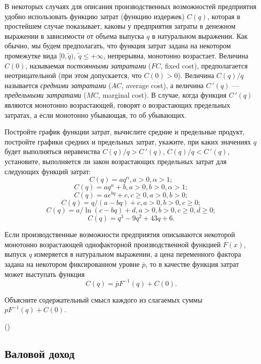     В некоторых случаях для описания производственных возможностей
    предприятия удобно использовать функцию
    затрат (функцию издержек) $C(q)$, которая в простейшем случае показывает, каковы у
    предприятия затраты в денежном выражении в зависимости
    от объема выпуска $q$ в натуральном выражении.
       Как обычно, мы будем предполагать, что функция затрат задана
    на некотором промежутке вида $[0,\tilde{q}), \ \tilde{q}\leqslant+\infty$,
    непрерывна, монотонно возрастает. Величина $C(0)$, называемая
    \emph{постоянными затратами} ($FC$, fixed cost), предполагается
    неотрицательной (при этом допускается, что $C(0)>0$).
    Величина $C(q)/q$ называется \emph{средними затратами} ($AC$, average cost), а величина
    $C\,'(q)$ --- \emph{предельными затратами} ($MC$, marginal cost).
    В случае, когда функция $C\,'(q)$
     являются монотонно возрастающей, говорят о
    возрастающих предельных затратах, а если монотонно убывающая, то об убывающих.

\begin{exer}
    Постройте график функции затрат, вычислите средние и предельные продукт,
    постройте графики средних и предельных затрат, укажите, при каких значениях $q$
     будет выполняться неравенства $C(q)/q>C\,'(q)$, $C(q)/q<C\,'(q)$, установите, выполняется ли закон
     возрастающих предельных затрат для следующих функций затрат:
    \[C(q)=aq^{\alpha}, a>0,  \alpha>1;\]
    \[C(q)=aq^{\alpha}+b, a>0, b>0,  \alpha>1;\]
    \[C(q)=ae^{bq}+c, c\geq0, a>0, b>0;\]
    \[C(q)=q/(a-bq)+c, a>0, b>0, c\geqslant0;\]
    \[C(q)=a/\ln(c-bq)+d, a>0, b>0, c\geqslant0, d\geqslant0;\]
    \[C(q)=q^{3}-9q^{2}+43q+6.\]
\end{exer}


    Если производственные возможности предприятия описываются
    некоторой монотонно возрастающей однофакторной производственной
    функцией $F(x)$, выпуск $q$ измеряется в натуральном выражении, а цена
    переменного фактора задана на некотором
    фиксированном уровне $\bar{p}$, то в качестве функция затрат
    может выступать функция
    \[C(q)=\bar{p}F^{-1}(q)+C(0).\]

\begin{exer}
    Объясните содержательный смысл каждого из слагаемых суммы
$pF^{-1}(q)+C(0)$.
\end{exer}
    ()


\subsection{Валовой доход}

